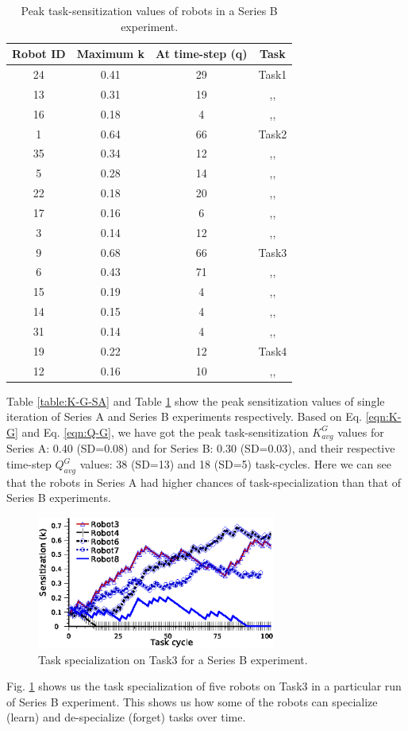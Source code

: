 \documentclass[smallcondensed]{svjour3}
\begin{document}
\begin{table}
\centering
\caption{Peak task-sensitization values of robots in a Series B experiment.}
\begin{tabular}{|c|c|c|c|}
\hline \textbf{Robot ID} & \textbf{Maximum k} & \textbf{At time-step (q)} & \textbf{Task} \\
\hline 24 & 0.41 & 29 & Task1\\
\hline 13 & 0.31 & 19 & ,,\\
\hline 16 & 0.18 & 4 & ,,\\
\hline 1 & 0.64 & 66 & Task2\\
\hline 35 & 0.34 & 12 & ,,\\
\hline 5 & 0.28 & 14 & ,,\\
\hline 22 & 0.18 & 20 & ,,\\
\hline 17 & 0.16 & 6 & ,,\\
\hline 3 & 0.14 & 12 & ,,\\
\hline 9 & 0.68 & 66 & Task3\\
\hline 6 & 0.43 & 71 & ,,\\
\hline 15 & 0.19 & 4 & ,,\\
\hline 14 & 0.15 & 4 & ,,\\
\hline 31 & 0.14 & 4 & ,,\\
\hline 19 & 0.22 & 12 & Task4\\
\hline 12 & 0.16 & 10 & ,,\\
\hline 
\end{tabular} 
\label{table:K-G-SB}
\end{table}
Table \ref{table:K-G-SA} and Table \ref{table:K-G-SB} show the peak sensitization values of single iteration of Series A and Series B experiments respectively.  Based on Eq. \ref{eqn:K-G} and Eq. \ref{eqn:Q-G}, we have got the peak task-sensitization $K^G_{avg} 
$ values for Series A: 0.40 (SD=0.08)  and for Series B: 0.30 (SD=0.03), and their respective time-step $Q^G_{avg}$ values: 38 (SD=13) and 18 (SD=5) task-cycles. Here we can see that the robots in Series A had higher chances of task-specialization than that of Series B experiments.
\begin{figure}
\centering
\includegraphics[width=0.7\textwidth, angle=0]{images/TaskSpecialization-task3-10may-1.eps}
\caption{Task specialization on Task3 for a Series B experiment.}
\label{fig:k-single-task-SB} 
\end{figure}
Fig. \ref{fig:k-single-task-SB} shows us the task specialization of five robots on Task3 in a particular run of Series B experiment. This shows us how some of the robots can specialize (learn) and de-specialize (forget) tasks over time.
\end{document}
